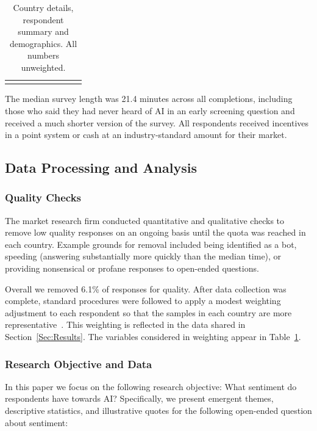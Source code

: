 \documentclass[11pt]{article} %
\begin{document}
\begin{table}[t!]
\begin{tabularx}{1.01\textwidth}{@{}l XXXXXXXX@{}}
\bottomrule
\vspace{0.01cm}

\end{tabularx}

\caption{ Country details, respondent summary and demographics. All numbers unweighted. }
\label{tab:demographics}

\end{table}






The median survey length was 21.4 minutes across all completions, including those who said they had never heard of AI in an early screening question and received a much shorter version of the survey. All respondents received incentives in a point system or cash at an industry-standard amount for their market.

\subsection{Data Processing and Analysis}

\subsubsection{Quality Checks}
The market research firm conducted quantitative and qualitative checks to remove low quality responses on an ongoing basis until the quota was reached in each country. Example grounds for removal included being identified as a bot, speeding (answering substantially more quickly than the median time), or providing nonsensical or profane responses to open-ended questions.

Overall we removed 6.1\% of responses for quality. After data collection was complete, standard procedures were followed to apply a modest weighting adjustment to each respondent so that the samples in each country are more representative~\cite{biemer2008weighting}. 
This weighting is reflected in the data shared in Section~\ref{Sec:Results}. The variables considered in weighting appear in Table~\ref{tab:demographics}.

\subsubsection{Research Objective and Data}
In this paper we focus on the following research objective: What sentiment do respondents have towards AI? Specifically, we present emergent themes, descriptive statistics, and illustrative quotes for the following open-ended question about sentiment: 
\end{document}
